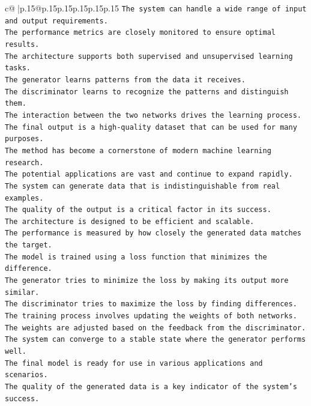 \documentclass{article}
\begin{document}
{\begin{supertabular}{c@{$\;$}|p{.15\linewidth}@{}p{.15\linewidth}p{.15\linewidth}p{.15\linewidth}p{.15\linewidth}p{.15\linewidth}}
{{{\texttt{The system can handle a wide range of input and output requirements.  } \\
\texttt{The performance metrics are closely monitored to ensure optimal results.  } \\
\texttt{The architecture supports both supervised and unsupervised learning tasks.  } \\
\texttt{The generator learns patterns from the data it receives.  } \\
\texttt{The discriminator learns to recognize the patterns and distinguish them.  } \\
\texttt{The interaction between the two networks drives the learning process.  } \\
\texttt{The final output is a high{-}quality dataset that can be used for many purposes.  } \\
\texttt{The method has become a cornerstone of modern machine learning research.  } \\
\texttt{The potential applications are vast and continue to expand rapidly.  } \\
\texttt{The system can generate data that is indistinguishable from real examples.  } \\
\texttt{The quality of the output is a critical factor in its success.  } \\
\texttt{The architecture is designed to be efficient and scalable.  } \\
\texttt{The performance is measured by how closely the generated data matches the target.  } \\
\texttt{The model is trained using a loss function that minimizes the difference.  } \\
\texttt{The generator tries to minimize the loss by making its output more similar.  } \\
\texttt{The discriminator tries to maximize the loss by finding differences.  } \\
\texttt{The training process involves updating the weights of both networks.  } \\
\texttt{The weights are adjusted based on the feedback from the discriminator.  } \\
\texttt{The system can converge to a stable state where the generator performs well.  } \\
\texttt{The final model is ready for use in various applications and scenarios.  } \\
\texttt{The quality of the generated data is a key indicator of the system's success.  } \\
}}}
\end{supertabular}}
\end{document}
